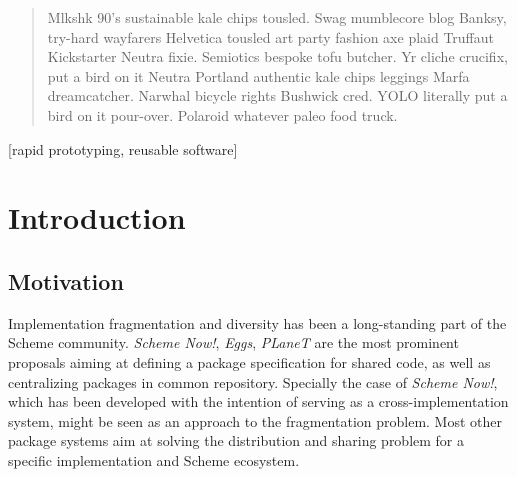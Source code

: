 \documentclass{acm_proc_article-sp}
\begin{document}
\maketitle
\begin{abstract}

Mlkshk 90's sustainable kale chips tousled. Swag mumblecore blog Banksy, try-hard wayfarers Helvetica tousled art party fashion axe plaid Truffaut Kickstarter Neutra fixie. Semiotics bespoke tofu butcher. Yr cliche crucifix, put a bird on it Neutra Portland authentic kale chips leggings Marfa dreamcatcher. Narwhal bicycle rights Bushwick cred. YOLO literally put a bird on it pour-over. Polaroid whatever paleo food truck.



\end{abstract}

[rapid prototyping, reusable software]




\section{Introduction}

\subsection{Motivation}

Implementation fragmentation and diversity has been a long-standing part of the Scheme community. \textit{Scheme Now!}, \textit{Eggs}, \textit{PLaneT} are the most prominent proposals aiming at defining a package specification for shared code, as well as centralizing packages in common repository. Specially the case of \textit{Scheme Now!}, which has been developed with the intention of serving as a cross-implementation system, might be seen as an approach to the fragmentation problem. Most other package systems aim at solving the distribution and sharing problem for a specific implementation and Scheme ecosystem.
\end{document}
